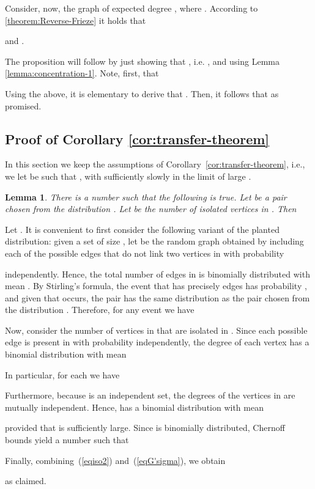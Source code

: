 \documentclass[a4paper,10pt]{article}
\makeatletter
\newcommand{\qed}{\hfill\smallskip}
\newtheorem{lemma}{Lemma}\renewcommand{\thelemma}{\arabic{lemma}}
\newenvironment{proof}{\noindent{\bf Proof\@:}}{\hfill \\}
\newcommand\Cor{Corollary}
\makeatother
\begin{document}
Consider, now, the graph  of expected degree 
, where .
According to \ref{theorem:Reverse-Frieze} it holds that 

and
.

The proposition will follow by just showing that ,
i.e. , and using Lemma \ref{lemma:concentration-1}.
Note, first, that

Using the above, it is elementary to derive that .
Then, it follows that  as promised.
\qed




\subsection{Proof of Corollary \ref{cor:transfer-theorem}}\label{sec:cor:transfer-theorem}

In this section we keep the assumptions of \Cor~\ref{cor:transfer-theorem},
i.e., we let  be such that , with
 sufficiently slowly in the limit of large .



\begin{lemma}\label{Lemma_isoPnm}
There is a number  such that the following is true. Let
 be a pair chosen from the distribution .
Let  be the number of isolated vertices in . Then

\end{lemma}
\begin{proof}
Let . It is convenient to first consider the following
variant of the planted distribution: given a set 
of size , let  be the random graph obtained by including each
of the  possible edges that do not link two
vertices in  with probability

independently. Hence, the total number of edges in  is binomially
distributed with mean . By Stirling's formula, the event 
that  has precisely  edges has probability ,
and given that  occurs, the pair  has the same
distribution as the pair  chosen from the distribution
. Therefore, for any event  we have 



\noindent
Now, consider the number  of vertices in  that are
isolated in . Since each possible edge is present in 
with probability  independently, the degree of each vertex
 has a binomial distribution  with mean

In particular, for each  we have

Furthermore, because  is an independent set, the degrees
of the vertices in  are mutually independent. Hence, 
has a binomial distribution 
with mean

provided that  is sufficiently large. Since  is binomially 
distributed, Chernoff bounds yield a number  such
that 

Finally, combining~(\ref{eqiso2}) and~(\ref{eqG'sigma}), we obtain

as claimed.
\end{proof}
\end{document}

